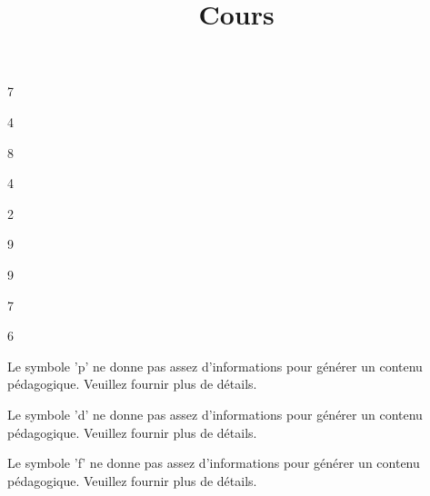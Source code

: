 \documentclass[11pt]{article}
\title{Cours}
\begin{document}
\maketitle











7




4





8





4






2





9





9

7


6




Le symbole 'p' ne donne pas assez d'informations pour générer un contenu pédagogique. Veuillez fournir plus de détails.

Le symbole 'd' ne donne pas assez d'informations pour générer un contenu pédagogique. Veuillez fournir plus de détails.

Le symbole 'f' ne donne pas assez d'informations pour générer un contenu pédagogique. Veuillez fournir plus de détails.
\end{document}
